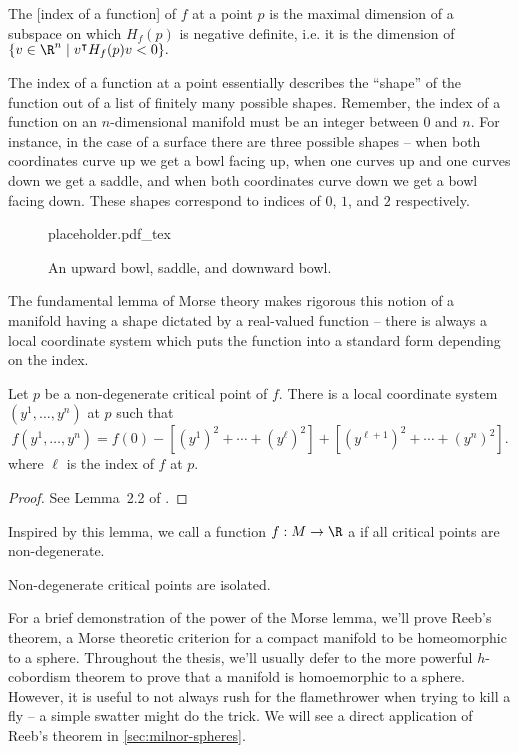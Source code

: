 \begin{definition}
	The [index of a function] of $f$ at a point $p$ is the maximal dimension of a subspace on which $H_f(p)$ is negative definite, i.e. it is the dimension of $\{v\in \R^n \mid v^\intercal H_f(p) v < 0\}.$
\end{definition}

The index of a function at a point essentially describes the ``shape'' of the function out of a list of finitely many possible shapes. Remember, the index of a function on an $n$-dimensional manifold must be an integer between $0$ and $n$. For instance, in the case of a surface there are three possible shapes -- when both coordinates curve up we get a bowl facing up, when one curves up and one curves down we get a saddle, and when both coordinates curve down we get a bowl facing down. These shapes correspond to indices of $0$, $1$, and $2$ respectively.
\begin{figure}[ht]
	\centering
	{placeholder.pdf_tex}
	\caption{An upward bowl, saddle, and downward bowl.}
\end{figure}

The fundamental lemma of Morse theory makes rigorous this notion of a manifold having a shape dictated by a real-valued function -- there is always a local coordinate system which puts the function into a standard form depending on the index.

\begin{lemma}\label{lemma:morse}
	Let $p$ be a non-degenerate critical point of $f$. There is a local coordinate system $(y^1,\ldots, y^n)$ at $p$ such that
	\begin{equation}
		f(y^1,\ldots, y^n)=f(0)-\left[(y^1)^2 + \cdots + (y^{\ell})^2\right] + \left[(y^{\ell + 1})^2 + \cdots + (y^n)^2\right].
	\end{equation}
	where $\ell$ is the index of $f$ at $p$.
\end{lemma}
\begin{proof}
	See Lemma~2.2 of \cite{milnor1963morse}.
\end{proof}

Inspired by this lemma, we call a function $f : M \to \R$ a  if all critical points are non-degenerate.

\begin{corollary}
	Non-degenerate critical points are isolated.
\end{corollary}

For a brief demonstration of the power of the Morse lemma, we'll prove Reeb's theorem, a Morse theoretic criterion for a compact manifold to be homeomorphic to a sphere. Throughout the thesis, we'll usually defer to the more powerful $h$-cobordism theorem to prove that a manifold is homoemorphic to a sphere.
However, it is useful to not always rush for the flamethrower when trying to kill a fly -- a simple swatter might do the trick. We will see a direct application of Reeb's theorem in \cref{sec:milnor-spheres}.

